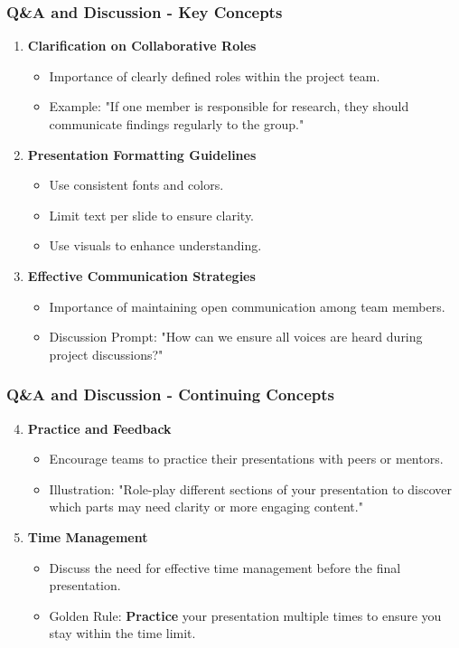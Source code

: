 \documentclass[aspectratio=169]{beamer}
\begin{document}
\begin{frame}[fragile]
  \frametitle{Q\&A and Discussion - Key Concepts}
  \begin{enumerate}
    \item \textbf{Clarification on Collaborative Roles}
      \begin{itemize}
        \item Importance of clearly defined roles within the project team.
        \item Example: "If one member is responsible for research, they should communicate findings regularly to the group."
      \end{itemize}
    
    \item \textbf{Presentation Formatting Guidelines}
      \begin{itemize}
        \item Use consistent fonts and colors.
        \item Limit text per slide to ensure clarity.
        \item Use visuals to enhance understanding.
      \end{itemize}
    
    \item \textbf{Effective Communication Strategies}
      \begin{itemize}
        \item Importance of maintaining open communication among team members.
        \item Discussion Prompt: "How can we ensure all voices are heard during project discussions?"
      \end{itemize}
  \end{enumerate}
\end{frame}

\begin{frame}[fragile]
  \frametitle{Q\&A and Discussion - Continuing Concepts}
  \begin{enumerate}
    \setcounter{enumi}{3}
    \item \textbf{Practice and Feedback}
      \begin{itemize}
        \item Encourage teams to practice their presentations with peers or mentors.
        \item Illustration: "Role-play different sections of your presentation to discover which parts may need clarity or more engaging content."
      \end{itemize}

    \item \textbf{Time Management}
      \begin{itemize}
        \item Discuss the need for effective time management before the final presentation.
        \item Golden Rule: \textbf{Practice} your presentation multiple times to ensure you stay within the time limit.
      \end{itemize}
  \end{enumerate}
\end{frame}
\end{document}
